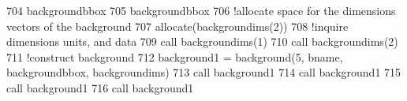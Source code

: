 \begin{DoxyCode}
704     backgroundbbox%
705     backgroundbbox%
706     \textcolor{comment}{!allocate space for the dimensions vectors of the background}
707     \textcolor{keyword}{allocate}(backgroundims(2))
708     \textcolor{comment}{!inquire dimensions units, and data}
709     \textcolor{keyword}{call }backgroundims(1)%
710     \textcolor{keyword}{call }backgroundims(2)%
711     \textcolor{comment}{!construct background}
712     background1 = background(5, bname, backgroundbbox, backgroundims)
713     \textcolor{keyword}{call }background1%
714     \textcolor{keyword}{call }background1%
715     \textcolor{keyword}{call }background1%
716     \textcolor{keyword}{call }background1%
\end{DoxyCode}
